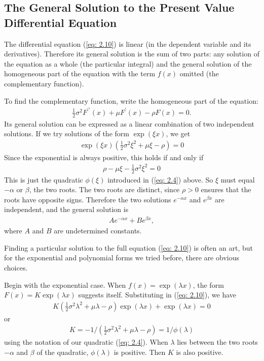 \documentclass[\topdir/lecture\_notes.tex]{subfiles}
\begin{document}
\begin{optional}
\subsection{The General Solution to the Present Value Differential Equation}
The differential equation (\ref{eq: 2.10}) is linear (in the dependent variable and its derivatives). Therefore its general solution is the sum of two parts: any solution of the equation as a whole (the particular integral) and the general solution of the homogeneous part of the equation with the term $f(x)$ omitted (the complementary function).

To find the complementary function, write the homogeneous part of the equation:
\begin{align*}
\frac{1}{2} \sigma^{2} F^{\prime \prime}(x)+\mu F^{\prime}(x)-\rho F(x)=0 .
\end{align*}
Its general solution can be expressed as a linear combination of two independent solutions. If we try solutions of the form $\exp(\xi x)$, we get
\begin{align*}
\exp (\xi x)\left(\frac{1}{2} \sigma^{2} \xi^{2}+\mu \xi-\rho\right)=0
\end{align*}
Since the exponential is always positive, this holds if and only if
\begin{align*}
\rho-\mu \xi-\frac{1}{2} \sigma^{2} \xi^{2}=0
\end{align*}
This is just the quadratic $\phi(\xi)$ introduced in (\ref{eq: 2.4}) above. So $\xi$ must equal $-\alpha$ or $\beta$, the two roots. The two roots are distinct, since $\rho>0$ ensures that the roots have opposite signs. Therefore the two solutions $e^{-\alpha x}$ and $e^{\beta x}$ are independent, and the general solution is
\begin{align}
A e^{-\alpha x}+B e^{\beta x}, \label{eq: 2.11}
\end{align}
where $A$ and $B$ are undetermined constants.

Finding a particular solution to the full equation (\ref{eq: 2.10}) is often an art, but for the exponential and polynomial forms we tried before, there are obvious choices.

Begin with the exponential case. When $f(x)=\exp (\lambda x)$, the form $F(x)=K \exp (\lambda x)$ suggests itself. Substituting in (\ref{eq: 2.10}), we have
\begin{align*}
K\left(\frac{1}{2} \sigma^{2} \lambda^{2}+\mu \lambda-\rho\right) \exp (\lambda x)+\exp (\lambda x)=0
\end{align*}
or
\begin{align*}
K=-1 /\left(\frac{1}{2} \sigma^{2} \lambda^{2}+\mu \lambda-\rho\right)=1 / \phi(\lambda)
\end{align*}
using the notation of our quadratic (\ref{eq: 2.4}). When $\lambda$ lies between the two roots $-\alpha$ and $\beta$ of the quadratic, $\phi(\lambda)$ is positive. Then $K$ is also positive.


\end{optional}
\end{document}
